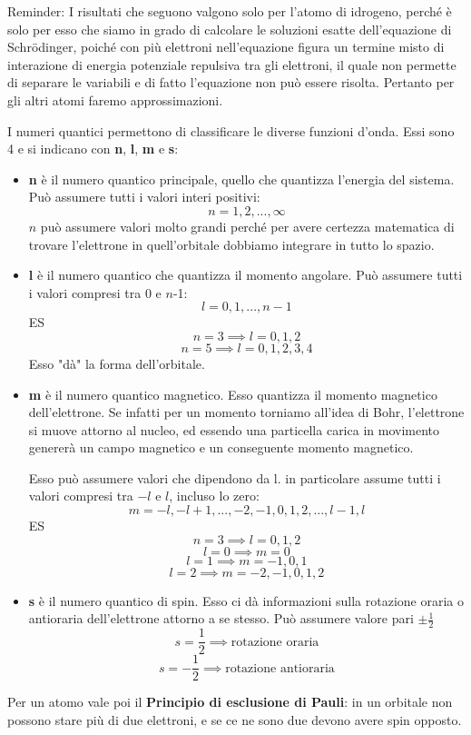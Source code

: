 Reminder: I risultati che seguono valgono solo per l'atomo di idrogeno, perché è solo per esso che siamo in grado di calcolare le soluzioni esatte dell'equazione di Schrödinger, poiché con più elettroni nell'equazione figura un termine misto di interazione di energia potenziale repulsiva tra gli elettroni, il quale non permette di separare le variabili e di fatto l'equazione non può essere risolta. Pertanto per gli altri atomi faremo approssimazioni.

I numeri quantici permettono di classificare le diverse funzioni d'onda. Essi sono 4 e si indicano con \textbf{n}, \textbf{l}, \textbf{m} e \textbf{s}:
\begin{itemize}
  \item \textbf{n} è il numero quantico principale, quello che quantizza l'energia del sistema.
  Può assumere tutti i valori interi positivi:
  $${n=1,2,...,\infty}$$
  $n$ può assumere valori molto grandi perché per avere certezza matematica di trovare l'elettrone in quell'orbitale dobbiamo integrare in tutto lo spazio.
  \item \textbf{l} è il numero quantico che quantizza il momento angolare. Può assumere tutti i valori compresi tra 0 e $n$-1:
  $$l=0,1,...,n-1$$
  ES
  $$n=3 \implies l=0,1,2$$
  $$n=5 \implies l=0,1,2,3,4$$
  Esso "dà" la forma dell'orbitale.
  \item \textbf{m} è il numero quantico magnetico. Esso quantizza il momento magnetico dell'elettrone. Se infatti per un momento torniamo all'idea di Bohr, l'elettrone si muove attorno al nucleo, ed essendo una particella carica in movimento genererà un campo magnetico e un conseguente momento magnetico.
  
  Esso può assumere valori che dipendono da l. in particolare assume tutti i valori compresi tra $-l$ e $l$, incluso lo zero:
  $$m=-l,-l+1,...,-2,-1,0,1,2,...,l-1,l$$
  ES 
  $$n=3 \implies l=0,1,2$$
  $$l=0 \implies m=0$$
  $$l=1 \implies m=-1,0,1$$
  $$l=2 \implies m=-2,-1,0,1,2$$
  \item \textbf{s} è il numero quantico di spin. Esso ci dà informazioni sulla rotazione oraria o antioraria dell'elettrone attorno a se stesso. Può assumere valore pari $\pm\frac{1}{2}$
  $$s=\frac{1}{2}\implies \text{rotazione oraria}$$
  $$s=-\frac{1}{2}\implies \text{rotazione antioraria}$$
\end{itemize}

Per un atomo vale poi il \textbf{Principio di esclusione di Pauli}: in un orbitale non possono stare più di due elettroni, e se ce ne sono due devono avere spin opposto.

